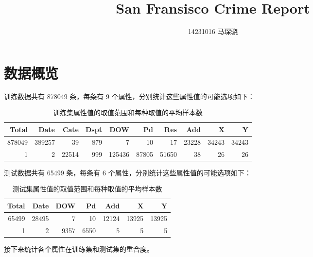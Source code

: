 \documentclass[a4paper]{article}
\author{14231016 马琛骁}
\title{San Fransisco Crime Report}
\begin{document}
\maketitle

\section{数据概览}

训练数据共有 878049 条，每条有 9 个属性，分别统计这些属性值的可能选项如下：

\begin{table}[h]
    \centering
    \begin{tabular}{*{10}{r}}
        \hline
        Total & Date & Cate & Dspt & DOW & Pd & Res & Add & X & Y \\
        \hline
        878049 & 389257 & 39 & 879 & 7 & 10 & 17 & 23228 & 34243 & 34243 \\
        1 & 2 & 22514 & 999 & 125436 & 87805 & 51650 & 38 & 26 & 26 \\
        \hline
    \end{tabular}
    \caption{训练集属性值的取值范围和每种取值的平均样本数}
\end{table}

测试数据共有 65499 条，每条有 6 个属性，分别统计这些属性值的可能选项如下：

\begin{table}[h]
    \centering
    \begin{tabular}{*{7}{r}}
        \hline
        Total & Date & DOW & Pd & Add & X & Y \\
        \hline
        65499 & 28495 & 7 & 10 & 12124 & 13925 & 13925 \\
        1 & 2 & 9357 & 6550 & 5 & 5 & 5 \\
        \hline
    \end{tabular}
    \caption{测试集属性值的取值范围和每种取值的平均样本数}
\end{table}

接下来统计各个属性在训练集和测试集的重合度。
\end{document}
